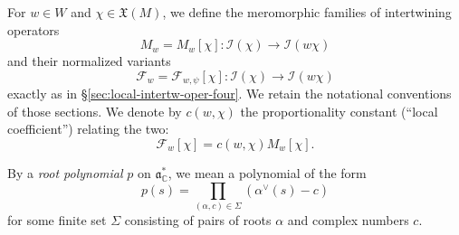 For $w \in W$ and $\chi \in \mathfrak{X}(M)$, we define the meromorphic families of intertwining operators
\begin{equation*}
  M_w = M_w[\chi] : \mathcal{I}(\chi) \rightarrow \mathcal{I}(w \chi)
\end{equation*}
and their normalized variants
\begin{equation*}
  \mathcal{F}_w = \mathcal{F}_{w,\psi}[\chi] : \mathcal{I}(\chi) \rightarrow \mathcal{I}(w \chi)
\end{equation*}
exactly as in \S\ref{sec:local-intertw-oper-four}.  We retain the notational conventions of those sections.  We denote by $c(w,\chi)$ the proportionality constant (``local coefficient'') relating the two:
\begin{equation*}
  \mathcal{F}_w[\chi] = c(w,\chi) M_w[\chi].
\end{equation*}

By a \emph{root polynomial} $p$ on $\mathfrak{a}_{\mathbb{C}}^*$, we mean a polynomial of the form
\begin{equation*}
  p(s) = \prod_{(\alpha,c) \in \Sigma}
  ( \alpha^\vee(s) - c  )
\end{equation*}
for some finite set $\Sigma$ consisting of pairs of roots $\alpha$ and complex numbers $c$.

